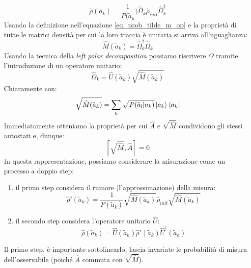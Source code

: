 \begin{equation}\label{eq:prob_omega}
    \hat \rho (\tilde a_k ) = \frac{1}{P(\tilde a_k}) \hat \Omega_k \hat \rho_{init}\hat \Omega^\dagger_k
\end{equation}
Usando la definizione nell'equazione \ref{eq_prob_tilde_m_op} e la proprietà di tutte le matrici densità per cui la loro traccia è unitaria si arriva all'uguaglianza:
\begin{equation*}
    \hat M(\tilde a _k ) = \hat \Omega_k^\dagger \hat \Omega_k
\end{equation*}
Usando la tecnica della \textit{left polar decomposition} possiamo riscrivere $\Omega$ tramite l'introduzione di un operatore unitario:
\begin{equation*}
    \hat\Omega_k = \hat U(\tilde a_k) \sqrt{\hat M(\tilde a_k)}
\end{equation*}
Chiaramente con:
\begin{equation*}
    \sqrt{\hat M(\tilde a_k)} = \sum_k \sqrt{P(\tilde a_l | a_k)}\ket{a_k}\bra{a_k}
\end{equation*}
Immediatamente otteniamo la proprietà per cui $\hat A$ e $\sqrt{\hat M}$ condividono gli stessi autostati e, dunque:
\begin{equation*}
    \left[ \sqrt{\hat M}, \hat A \right] = 0
\end{equation*}
In questa rappresentazione, possiamo considerare la misurazione come un processo a doppio step: 
\begin{enumerate}
    \item il primo step considera il rumore (l'approssimazione) della misura:
        \begin{equation}
            \hat \rho'(\tilde a_k) = \frac{1}{P(\tilde a_k)}\sqrt{\hat M(\tilde a_k)}\hat \rho_{init}\sqrt{\hat M(\tilde a_k)}
        \end{equation}
    \item il secondo step considera l'operatore unitario $\hat U$:
        \begin{equation*}
            \hat \rho (\tilde a_k) = \hat U (\tilde a_k ) \hat \rho'(\tilde a_k) \hat U^\dagger (\tilde a_k)
        \end{equation*}
\end{enumerate}
Il primo step, è importante sottolinearlo, lascia invariate le probabilità di misura dell'osservabile (poiché $\hat A$ commuta con $\sqrt{\hat M}$).

\vspace{0.5cm}

